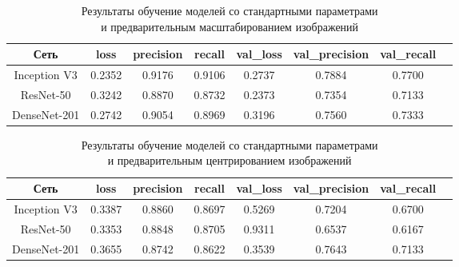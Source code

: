 \begin{table}[H]
    \centering
    \caption{Результаты обучение моделей со стандартными параметрами \\и предварительным масштабированием изображений} \label{rescale}
    \begin{tabular}{|c|c|c|c|c|c|c|c|}
        \hline    
        Сеть          & loss   & precision & recall & val\_loss & val\_precision & val\_recall \\ %
        \hline
        Inception V3  & 0.2352 & 0.9176    & 0.9106 & 0.2737   & 0.7884        & 0.7700 \\ %
        \hline
        ResNet-50     & 0.3242 & 0.8870    & 0.8732 & 0.2373    & 0.7354         & 0.7133 \\ %
        \hline
        DenseNet-201  & 0.2742 & 0.9054    & 0.8969 & 0.3196    & 0.7560         & 0.7333 \\ %
        \hline
      \end{tabular}
\end{table}

\begin{table}[H]
    \centering
    \caption{Результаты обучение моделей со стандартными параметрами \\и предварительным центрированием изображений} \label{samplewise}    
    \begin{tabular}{|c|c|c|c|c|c|c|c|}
        \hline    
        Сеть          & loss   & precision & recall & val\_loss & val\_precision & val\_recall \\ %
        \hline
        Inception V3  & 0.3387 & 0.8860    & 0.8697 & 0.5269    & 0.7204         & 0.6700 \\ %
        \hline
        ResNet-50     & 0.3353  & 0.8848   & 0.8705 & 0.9311   & 0.6537        & 0.6167 \\ %
        \hline
        DenseNet-201  & 0.3655  & 0.8742   & 0.8622 & 0.3539   & 0.7643        & 0.7133 \\ %
        \hline
      \end{tabular}
\end{table}




